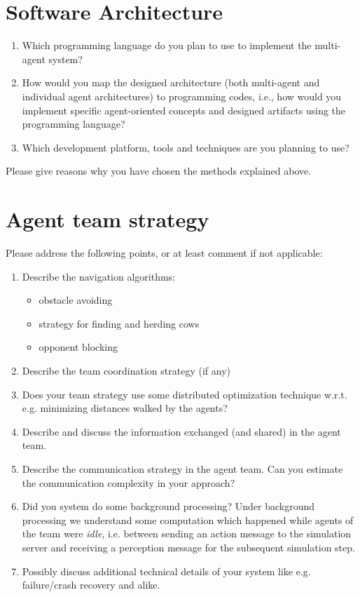 \documentclass{llncs}
\begin{document}
\section{Software Architecture}

\begin{enumerate}
  \item Which programming language do you plan to use to implement the multi-agent system?
  \item How would you map the designed architecture (both multi-agent and individual agent architectures)
    to programming codes, i.e., how would you implement specific agent-oriented
    concepts and designed artifacts using the programming language?
  \item Which development platform, tools and techniques are you planning to use?

\end{enumerate}
Please give reasons why you have chosen the methods explained above.

\section{Agent team strategy}

Please address the following points, or at least comment if not applicable:

\begin{enumerate}
    \item Describe the navigation algorithms:
        \begin{itemize}
            \item obstacle avoiding
            \item strategy for finding and herding cows
            \item opponent blocking
        \end{itemize}
    \item Describe the team coordination strategy (if any)
    \item Does your team strategy use some distributed optimization
        technique w.r.t. e.g.  minimizing distances walked by the
        agents?
    \item Describe and discuss the information exchanged (and shared) in
        the agent team.
    \item Describe the communication strategy in the agent team. Can you
        estimate the communication complexity in your approach?
    \item Did you system do some background processing? Under background
        processing we understand some computation which happened while agents of
        the team were \textit{idle}, i.e. between sending an action
        message to the simulation server and receiving a perception
        message for the subsequent simulation step.
    \item Possibly discuss additional technical details of your system like
        e.g. failure/crash recovery and alike.
\end{enumerate}
\end{document}
